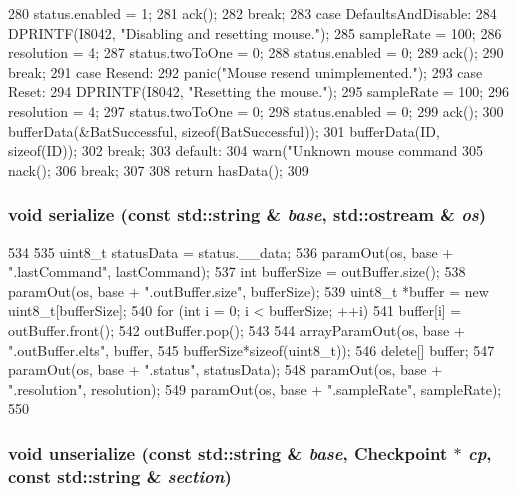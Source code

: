 \begin{DoxyCode}
{{280         status.enabled = 1;
281         ack();
282         break;
283       case DefaultsAndDisable:
284         DPRINTF(I8042, "Disabling and resetting mouse.\n");
285         sampleRate = 100;
286         resolution = 4;
287         status.twoToOne = 0;
288         status.enabled = 0;
289         ack();
290         break;
291       case Resend:
292         panic("Mouse resend unimplemented.\n");
293       case Reset:
294         DPRINTF(I8042, "Resetting the mouse.\n");
295         sampleRate = 100;
296         resolution = 4;
297         status.twoToOne = 0;
298         status.enabled = 0;
299         ack();
300         bufferData(&BatSuccessful, sizeof(BatSuccessful));
301         bufferData(ID, sizeof(ID));
302         break;
303       default:
304         warn("Unknown mouse command %
305         nack();
306         break;
307     }
308     return hasData();
309 }
\end{DoxyCode}
\hypertarget{classX86ISA_1_1PS2Mouse_ab4138b21b48e3371a8e20df72b675a88}{
\subsubsection[{serialize}]{\setlength{\rightskip}{0pt plus 5cm}void serialize (const std::string \& {\em base}, \/  std::ostream \& {\em os})}}
\label{classX86ISA_1_1PS2Mouse_ab4138b21b48e3371a8e20df72b675a88}



\begin{DoxyCode}
534 {
535     uint8_t statusData = status.__data;
536     paramOut(os, base + ".lastCommand", lastCommand);
537     int bufferSize = outBuffer.size();
538     paramOut(os, base + ".outBuffer.size", bufferSize);
539     uint8_t *buffer = new uint8_t[bufferSize];
540     for (int i = 0; i < bufferSize; ++i) {
541         buffer[i] = outBuffer.front();
542         outBuffer.pop();
543     }
544     arrayParamOut(os, base + ".outBuffer.elts", buffer,
545             bufferSize*sizeof(uint8_t));
546     delete[] buffer;
547     paramOut(os, base + ".status", statusData);
548     paramOut(os, base + ".resolution", resolution);
549     paramOut(os, base + ".sampleRate", sampleRate);
550 }
\end{DoxyCode}
\hypertarget{classX86ISA_1_1PS2Mouse_a147c320e3d6506edf5587a40cd8e430d}{
\subsubsection[{unserialize}]{\setlength{\rightskip}{0pt plus 5cm}void unserialize (const std::string \& {\em base}, \/  {\bf Checkpoint} $\ast$ {\em cp}, \/  const std::string \& {\em section})}}
\label{classX86ISA_1_1PS2Mouse_a147c320e3d6506edf5587a40cd8e430d}



